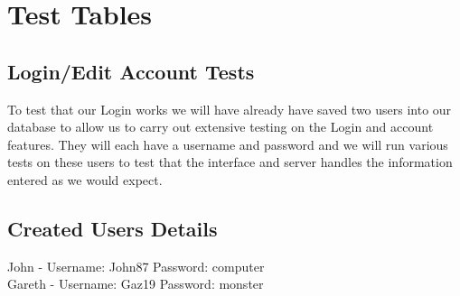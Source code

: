 \documentclass[titlepage]{article}
\begin{document}
\section{Test Tables} 
\subsection{Login/Edit Account Tests} 
To test that our Login works we will have already have saved two users into our database to allow us to carry out extensive testing on the Login and account features. They will each have a username and password and we will run various tests on these users to test that the interface and server handles the information entered as we would expect.
\subsection{Created Users Details}
John - Username: John87 Password: computer
\\
Gareth - Username: Gaz19 Password: monster
\newpage
\end{document}
